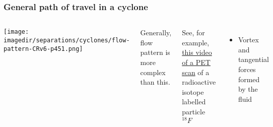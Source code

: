 \begin{frame}\frametitle{General path of travel in a cyclone {}}
	\begin{columns}[c]
			\begin{center}
				\texttt{[image: \\imagedir/separations/cyclones/flow-pattern-CRv6-p451.png]}
			\end{center}
			Generally, flow pattern is more complex than this.

			\vspace{12pt}
			See, for example, \href{http://www.youtube.com/watch?v=CWLARs\_dJO0}{this video of a PET scan} of a radioactive isotope labelled particle $^{18}F$

			\vspace{12pt}
			\begin{itemize}
				\item	Vortex and tangential forces formed by the fluid
			\end{itemize}
	\end{columns}
\end{frame}

